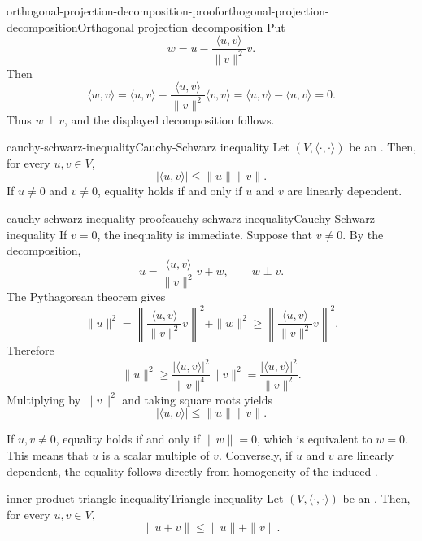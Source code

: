 \documentclass[preview]{standalone}
\begin{document}
\begin{snippetproof}{orthogonal-projection-decomposition-proof}{orthogonal-projection-decomposition}{Orthogonal projection decomposition}
    Put
    \[
        w=u-\frac{\langle u,v\rangle}{\|v\|^2}v.
    \]
    Then
    \[
        \langle w,v\rangle
        =
        \langle u,v\rangle
        -
        \frac{\langle u,v\rangle}{\|v\|^2}\langle v,v\rangle
        =
        \langle u,v\rangle-\langle u,v\rangle
        =
        0.
    \]
    Thus \(w\perp v\), and the displayed decomposition follows.
\end{snippetproof}

\begin{snippettheorem}{cauchy-schwarz-inequality}{Cauchy-Schwarz inequality}
    Let \((V,\langle\cdot,\cdot\rangle)\) be an \innerproductspace. Then,
    for every \(u,v\in V\),
    \[
        |\langle u,v\rangle|\leq\|u\|\|v\|.
    \]
    If \(u\neq0\) and \(v\neq0\), equality holds if and only if \(u\) and
    \(v\) are linearly dependent.
\end{snippettheorem}

\begin{snippetproof}{cauchy-schwarz-inequality-proof}{cauchy-schwarz-inequality}{Cauchy-Schwarz inequality}
    If \(v=0\), the inequality is immediate. Suppose that \(v\neq0\). By the
    \orthogonalprojection decomposition,
    \[
        u=
        \frac{\langle u,v\rangle}{\|v\|^2}v+w,
        \qquad
        w\perp v.
    \]
    The Pythagorean theorem gives
    \[
        \|u\|^2
        =
        \left\|
        \frac{\langle u,v\rangle}{\|v\|^2}v
        \right\|^2
        +
        \|w\|^2
        \geq
        \left\|
        \frac{\langle u,v\rangle}{\|v\|^2}v
        \right\|^2.
    \]
    Therefore
    \[
        \|u\|^2
        \geq
        \frac{|\langle u,v\rangle|^2}{\|v\|^4}\|v\|^2
        =
        \frac{|\langle u,v\rangle|^2}{\|v\|^2}.
    \]
    Multiplying by \(\|v\|^2\) and taking square roots yields
    \[
        |\langle u,v\rangle|\leq\|u\|\|v\|.
    \]

    If \(u,v\neq0\), equality holds if and only if \(\|w\|=0\), which is
    equivalent to \(w=0\). This means that \(u\) is a scalar multiple of
    \(v\). Conversely, if \(u\) and \(v\) are linearly dependent, the
    equality follows directly from homogeneity of the induced \norm.
\end{snippetproof}

\begin{snippettheorem}{inner-product-triangle-inequality}{Triangle inequality}
    Let \((V,\langle\cdot,\cdot\rangle)\) be an \innerproductspace. Then,
    for every \(u,v\in V\),
    \[
        \|u+v\|\leq\|u\|+\|v\|.
    \]
\end{snippettheorem}
\end{document}
